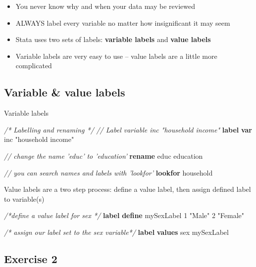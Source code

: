 \documentclass[
]{book}
\newenvironment{Shaded}{\begin{snugshade}}{\end{snugshade}}
\newcommand{\CommentTok}[1]{\textcolor[rgb]{0.56,0.35,0.01}{\textit{#1}}}
\newcommand{\KeywordTok}[1]{\textcolor[rgb]{0.13,0.29,0.53}{\textbf{#1}}}
\newcommand{\NormalTok}[1]{#1}
\newcommand{\StringTok}[1]{\textcolor[rgb]{0.31,0.60,0.02}{#1}}
\providecommand{\tightlist}{%
  \setlength{\itemsep}{0pt}\setlength{\parskip}{0pt}}
\begin{document}
\begin{itemize}
\tightlist
\item
  You never know why and when your data may be reviewed
\item
  ALWAYS label every variable no matter how insignificant it may seem
\item
  Stata uses two sets of labels: \textbf{variable labels} and \textbf{value labels}
\item
  Variable labels are very easy to use -- value labels are a little more complicated
\end{itemize}

\hypertarget{variable-value-labels}{%
\subsection{Variable \& value labels}\label{variable-value-labels}}

Variable labels

\begin{Shaded}
\begin{Highlighting}[]
  \CommentTok{/* Labelling and renaming */}
  \CommentTok{// Label variable inc "household income"}
  \KeywordTok{label} \KeywordTok{var}\NormalTok{ inc }\StringTok{"household income"}

  \CommentTok{// change the name 'educ' to 'education'}
  \KeywordTok{rename}\NormalTok{ educ education}

  \CommentTok{// you can search names and labels with 'lookfor'}
  \KeywordTok{lookfor}\NormalTok{ household}
\end{Highlighting}
\end{Shaded}

Value labels are a two step process: define a value label, then assign defined label to variable(s)

\begin{Shaded}
\begin{Highlighting}[]
  \CommentTok{/*define a value label for sex */}
  \KeywordTok{label} \KeywordTok{define}\NormalTok{ mySexLabel 1 }\StringTok{"Male"}\NormalTok{ 2 }\StringTok{"Female"}

  \CommentTok{/* assign our label set to the sex variable*/}
  \KeywordTok{label} \KeywordTok{values}\NormalTok{ sex mySexLabel}
\end{Highlighting}
\end{Shaded}

\hypertarget{exercise-2-4}{%
\subsection{Exercise 2}\label{exercise-2-4}}
\end{document}
